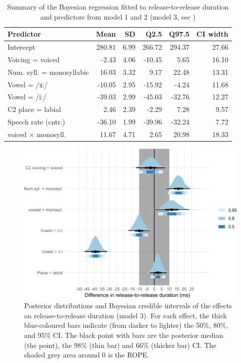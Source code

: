 \documentclass[
  12pt,
  a4paper,
]{article}
\begin{document}
\begin{table}[t]

\caption{\label{tab:rr-3-table}Summary of the Bayesian regression fitted to release-to-release duration and predictors from model 1 and 2 (model 3, see )}
\centering
\fontsize{8}{10}\selectfont
\begin{tabular}{lrrrrr}
\toprule
Predictor & Mean & SD & Q2.5 & Q97.5 & CI width\\
\midrule
Intercept & 280.81 & 6.99 & 266.72 & 294.37 & 27.66\\
Voicing = voiced & -2.43 & 4.06 & -10.45 & 5.65 & 16.10\\
Num. syll. = monosyllabic & 16.03 & 3.32 & 9.17 & 22.48 & 13.31\\
Vowel = /ɜː/ & -10.05 & 2.95 & -15.92 & -4.24 & 11.68\\
Vowel = /iː/ & -39.03 & 2.99 & -45.03 & -32.76 & 12.27\\
C2 place = labial & 2.46 & 2.39 & -2.29 & 7.28 & 9.57\\
Speech rate (cntr.) & -36.10 & 1.99 & -39.96 & -32.24 & 7.72\\
voiced × monosyll. & 11.67 & 4.71 & 2.65 & 20.98 & 18.33\\
\bottomrule
\end{tabular}
\end{table}

\begin{figure}
\includegraphics[width=\linewidth]{2019-english-rr_files/figure-latex/rr-3-intervals-1} \caption{Posterior distributions and Bayesian credible intervals of the effects on release-to-release duration (model 3). For each effect, the thick blue-coloured bars indicate (from darker to lighter) the 50\%, 80\%, and 95\% CI. The black point with bars are the posterior median (the point), the 98\% (thin bar) and 66\% (thicker bar) CI. The shaded grey area around 0 is the ROPE.}\label{f:rr-3-intervals}
\end{figure}
\end{document}

